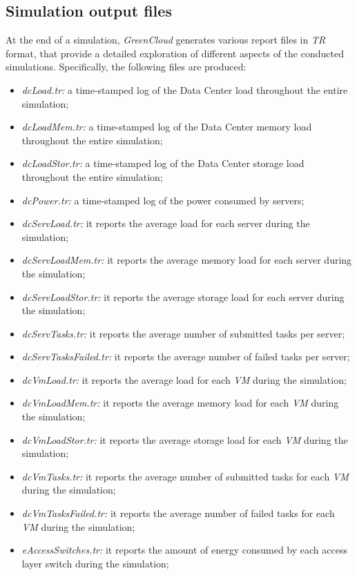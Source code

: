 \subsection{Simulation output files} \label{subsection:simulationoutput}
At the end of a simulation, \emph{GreenCloud} generates various report files in \emph{TR} format, that provide a detailed exploration of different aspects of the conducted simulations. Specifically, the following files are produced:
\begin{itemize}
    \item \emph{dcLoad.tr:} a time-stamped log of the Data Center load throughout the entire simulation;
    \item \emph{dcLoadMem.tr:} a time-stamped log of the Data Center memory load throughout the entire simulation;
    \item \emph{dcLoadStor.tr:} a time-stamped log of the Data Center storage load throughout the entire simulation;
    \item \emph{dcPower.tr:} a time-stamped log of the power consumed by servers;
    \item \emph{dcServLoad.tr:} it reports the average load for each server during the simulation;
    \item \emph{dcServLoadMem.tr:} it reports the average memory load for each server during the simulation;
    \item \emph{dcServLoadStor.tr:} it reports the average storage load for each server during the simulation;
    \item \emph{dcServTasks.tr:} it reports the average number of submitted tasks per server;
    \item \emph{dcServTasksFailed.tr:} it reports the average number of failed tasks per server;
    \item \emph{dcVmLoad.tr:} it reports the average load for each \emph{VM} during the simulation;
    \item \emph{dcVmLoadMem.tr:} it reports the average memory load for each \emph{VM} during the simulation;
    \item \emph{dcVmLoadStor.tr:} it reports the average storage load for each \emph{VM} during the simulation;
    \item \emph{dcVmTasks.tr:} it reports the average number of submitted tasks for each \emph{VM} during the simulation;
    \item \emph{dcVmTasksFailed.tr:} it reports the average number of failed tasks for each \emph{VM} during the simulation;
    \item \emph{eAccessSwitches.tr:} it reports the amount of energy consumed by each access layer switch during the simulation;

\end{itemize}
